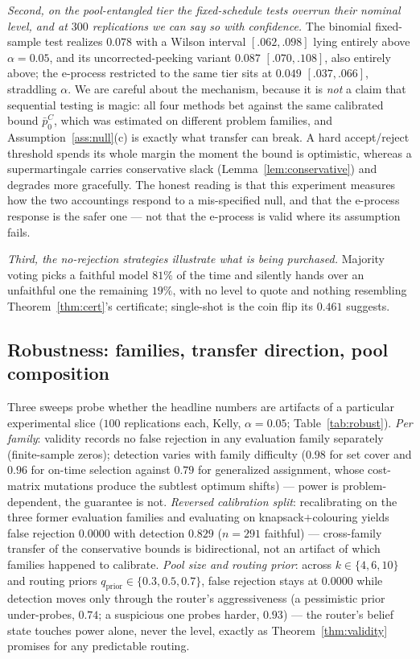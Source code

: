 \documentclass[pdflatex,sn-mathphys-num]{sn-jnl}
\theoremstyle{thmstyleone}
\theoremstyle{thmstyletwo}
\begin{document}
\emph{Second, on the pool-entangled tier the fixed-schedule tests
overrun their nominal level, and at $300$ replications we can say so
with confidence.} The binomial fixed-sample test realizes $0.078$ with
a Wilson interval $[.062, .098]$ lying entirely above $\alpha = 0.05$,
and its uncorrected-peeking variant $0.087$ $[.070, .108]$, also
entirely above; the e-process restricted to the same tier sits at
$0.049$ $[.037, .066]$, straddling $\alpha$. We are careful about the
mechanism, because it is \emph{not} a claim that sequential testing is
magic: all four methods bet against the same calibrated bound
$\bar p_0^{C}$, which was estimated on different problem families, and
Assumption~\ref{ass:null}(c) is exactly what transfer can break. A
hard accept/reject threshold spends its whole margin the moment the
bound is optimistic, whereas a supermartingale carries conservative
slack (Lemma~\ref{lem:conservative}) and degrades more gracefully.
The honest reading is that this experiment measures how the two
accountings respond to a mis-specified null, and that the e-process
response is the safer one --- not that the e-process is valid where
its assumption fails.

\emph{Third, the no-rejection strategies illustrate what is being
purchased.} Majority voting picks a faithful model $81\%$ of the time
and silently hands over an unfaithful one the remaining $19\%$, with
no level to quote and nothing resembling Theorem~\ref{thm:cert}'s
certificate; single-shot is the coin flip its $0.461$ suggests.

\subsection{Robustness: families, transfer direction, pool
composition}\label{sec:robustness}

Three sweeps probe whether the headline numbers are artifacts of a
particular experimental slice ($100$ replications each, Kelly,
$\alpha = 0.05$; Table~\ref{tab:robust}). \emph{Per family}: validity
records no false rejection in any evaluation family separately
(finite-sample zeros); detection varies with
family difficulty ($0.98$ for set cover and $0.96$ for on-time
selection against $0.79$ for generalized assignment, whose
cost-matrix mutations produce the subtlest optimum shifts) --- power
is problem-dependent, the guarantee is not. \emph{Reversed
calibration split}: recalibrating on the three former evaluation
families and evaluating on knapsack$+$colouring yields false
rejection $0.0000$ with detection $0.829$ ($n = 291$ faithful) ---
cross-family transfer of the conservative bounds is bidirectional,
not an artifact of which families happened to calibrate.
\emph{Pool size and routing prior}: across $k \in \{4, 6, 10\}$ and
routing priors $q_{\mathrm{prior}} \in \{0.3, 0.5, 0.7\}$, false
rejection stays at $0.0000$ while detection moves only through the
router's aggressiveness (a pessimistic prior under-probes, $0.74$; a
suspicious one probes harder, $0.93$) --- the router's belief state
touches power alone, never the level, exactly as
Theorem~\ref{thm:validity} promises for any predictable routing.
\end{document}
